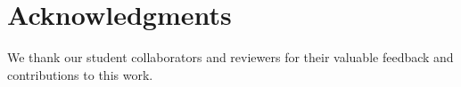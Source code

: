  \section*{Acknowledgments}
We thank our student collaborators and reviewers for their valuable feedback and contributions to this work.
